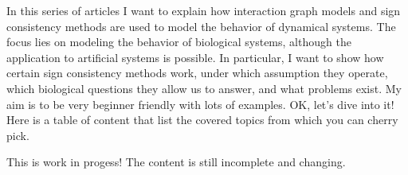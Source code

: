 In this series of articles I want to explain how interaction graph models
and sign consistency methods are used to model the behavior of dynamical systems.
The focus lies on modeling the behavior of biological systems, although the application to artificial systems is possible.
In particular, I want to show how certain sign consistency methods work, 
 under which assumption they operate,
 which biological questions they allow us to answer,
 and what problems exist. 
My aim is to be very beginner friendly with lots of examples. 
OK, let's dive into it!
Here is a table of content that list the covered topics from which you can cherry pick.

\bigskip
This is work in progess! The content is still incomplete and changing.